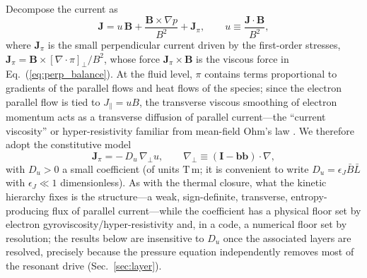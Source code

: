 \documentclass[english]{article}
\newcommand{\bB}{\mathbf{B}}
\newcommand{\bJ}{\mathbf{J}}
\newcommand{\bb}{\mathbf{b}}
\newcommand{\bI}{\mathbf{I}}
\newcommand{\gradperp}{\nabla_{\!\perp}}
\begin{document}
Decompose the current as
\begin{equation}
\bJ=u\,\bB+\frac{\bB\times\nabla p}{B^{2}}+\bJ_\pi ,
\qquad u\equiv\frac{\bJ\cdot\bB}{B^{2}} ,
\label{eq:J_decomposition}
\end{equation}
where $\bJ_\pi$ is the small perpendicular current driven by the first-order stresses,
$\bJ_\pi=\bB\times[\nabla\cdot\pi]_\perp/B^{2}$, whose force $\bJ_\pi\times\bB$ is the viscous
force in Eq.~(\ref{eq:perp_balance}). At the fluid level, $\pi$ contains terms proportional to
gradients of the parallel flows and heat flows of the species; since the electron parallel flow is
tied to $J_\parallel=uB$, the transverse viscous smoothing of electron momentum acts as a
transverse diffusion of parallel current---the ``current viscosity'' or hyper-resistivity familiar
from mean-field Ohm's law \cite{boozer1986,hameiri1987}. We therefore adopt the constitutive model
\begin{equation}
\bJ_\pi=-\,D_u\,\gradperp u ,
\qquad \gradperp\equiv(\bI-\bb\bb)\cdot\nabla ,
\label{eq:Jpi}
\end{equation}
with $D_u>0$ a small coefficient (of units $\mathrm{T\,m}$; it is convenient to write
$D_u=\epsilon_J\bar B\bar L$ with $\epsilon_J\ll1$ dimensionless). As with the thermal closure,
what the kinetic hierarchy fixes is the structure---a weak, sign-definite, transverse,
entropy-producing flux of parallel current---while the coefficient has a physical floor set by
electron gyroviscosity/hyper-resistivity and, in a code, a numerical floor set by resolution; the
results below are insensitive to $D_u$ once the associated layers are resolved, precisely because
the pressure equation independently removes most of the resonant drive
(Sec.~\ref{sec:layer}).
\end{document}
